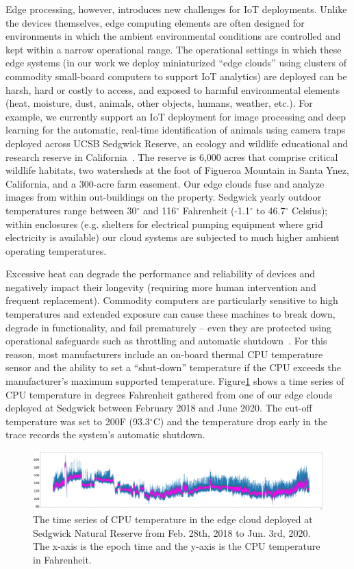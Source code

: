 Edge processing, however, introduces new challenges for IoT deployments. Unlike the devices themselves, edge computing elements are often designed for environments in which the ambient environmental conditions are controlled and kept within a narrow operational range. The operational settings in which these edge systems (in our work we deploy miniaturized ``edge clouds'' using clusters of commodity small-board computers to support IoT analytics) are deployed can be harsh, hard or costly to access, and exposed to harmful environmental elements (heat, moisture, dust, animals, other objects, humans, weather, etc.). For example, we currently support an IoT deployment for image processing and deep learning for the automatic, real-time identification of animals using camera traps deployed across UCSB Sedgwick Reserve, an ecology and wildlife educational and research reserve in California~\cite{ref:sedgwick}. The reserve is 6,000 acres that comprise critical wildlife habitats, two watersheds at the foot of Figueroa Mountain in Santa Ynez, California, and a 300-acre farm easement. Our edge clouds fuse and analyze images from within out-buildings on the property. Sedgwick yearly outdoor temperatures range between 30$^{\circ}$ and 116$^{\circ}$ Fahrenheit (-1.1$^{\circ}$ to 46.7$^{\circ}$ Celsius); within enclosures (e.g. shelters for electrical pumping equipment where grid electricity is available) our cloud systems are subjected to much higher ambient operating temperatures.

Excessive heat can degrade the performance and reliability of devices and negatively impact their longevity (requiring more human intervention and frequent replacement). Commodity computers are particularly sensitive to high temperatures and extended exposure can cause these machines to break down, degrade in functionality, and fail prematurely -- even they are protected using operational safeguards such as throttling and automatic shutdown~\cite{ref:overheating}. For this reason, most manufacturers include an on-board thermal CPU temperature sensor and the ability to set a ``shut-down'' temperature if the CPU exceeds the manufacturer's maximum supported temperature. Figure\ref{fig:time_series} shows a time series of CPU temperature in degrees Fahrenheit gathered from one of our edge clouds deployed at Sedgwick between February 2018 and June 2020. The cut-off temperature was set to 200\degree F (93.3$^{\circ}$C) and the temperature drop early in the trace records the system's automatic shutdown.

\begin{figure}
\includegraphics[width=\textwidth]{figures/time_series.png}
\caption{The time series of CPU temperature in the edge cloud deployed at Sedgwick Natural Reserve from Feb. 28th, 2018 to Jun. 3rd, 2020. The x-axis is the epoch time and the y-axis is the CPU temperature in Fahrenheit. } \label{fig:time_series}
\end{figure}

